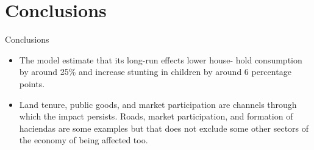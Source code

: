 \section{Conclusions}

\begin{frame}{Conclusions}
\begin{itemize}
    \item The model estimate that its long-run effects lower house- hold consumption by around 25\% and increase stunting in children by around 6 percentage points.\\[10pt]
    \item Land tenure, public goods, and market participation are channels through which the impact persists. Roads, market participation, and formation of haciendas are some examples but that does not exclude some other sectors of the economy of being affected too. 
    
    
\end{itemize}


\end{frame}
